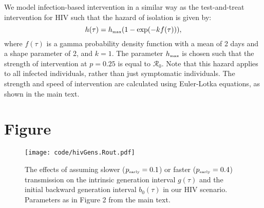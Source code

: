 \documentclass[12pt]{article}
\newcommand{\Rx}[1]{\ensuremath{{\mathcal R}_{#1}}}
\newcommand{\Ro}{\Rx{0}}
\newcommand{\tsub}[2]{#1_{{\textrm{\tiny #2}}}}
\newcommand{\pEarly}{\ensuremath{\tsub{p}{early}}}
\begin{document}
We model infection-based intervention in a similar way as the test-and-treat intervention for HIV such that the hazard of isolation is given by:
\begin{equation}
h(\tau) =  \tsub{h}{max} (1 - \exp(- k f(\tau))),
\end{equation}
where $f(\tau)$ is a gamma probability density function with a mean of 2 days and a shape parameter of 2, and $k = 1$.
The parameter $\tsub{h}{max}$ is chosen such that the strength of intervention at $p=0.25$ is equal to $\Ro$.
Note that this hazard applies to all infected individuals, rather than just symptomatic individuals.
The strength and speed of intervention are calculated using Euler-Lotka equations, as shown in the main text.

\pagebreak



\section{Figure}

\begin{figure}[!ht]
\texttt{[image: code/hivGens.Rout.pdf]}
\caption{
The effects of assuming slower ($\pEarly=0.1$) or faster ($\pEarly=0.4$) transmission on the intrinsic generation interval $g(\tau)$ and the initial backward generation interval $b_0(\tau)$ in our HIV scenario. Parameters as in Figure 2 from the main text.
}
\end{figure}
\end{document}
